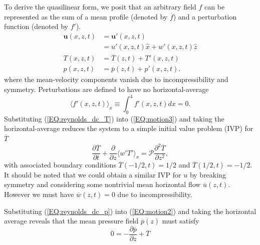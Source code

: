 \documentclass[reprint,amsmath,amssymb,aps,nofootinbib]{revtex4-1}
\renewcommand{\vec}[1]{\boldsymbol{#1}}
\newcommand{\eq}[1]{(\ref{#1})}
\begin{document}
To derive the quasilinear form, we posit that an arbitrary field $f$ can be represented as the sum of a mean profile (denoted by $\overline{f}$) and a perturbation function (denoted by $f'$).
\begin{align}
    \vec{u}(x, z, t) &= \vec{u'}(x, z, t) \label{EQ:reynolds_dc_u}\\
    &= u'(x, z, t)\hat{x} + w'(x, z, t)\hat{z} \\
    T(x, z, t) &= \overline{T}(z, t) + T'(x, z, t) \label{EQ:reynolds_dc_T}\\
    p(x, z, t) &= \overline{p}(z, t) +  p'(x, z, t) \label{EQ:reynolds_dc_p}.
\end{align}
where the mean-velocity components vanish due to incompressibility and symmetry. Perturbations are defined to have no horizontal-average
\begin{equation}
    \langle f'(x, z, t) \rangle_x \equiv \int_{0}^4 f'(x, z, t) dx = 0.
\end{equation}
Substituting \eq{EQ:reynolds_dc_T} into \eq{EQ:motion3} and taking the horizontal-average reduces the system to a simple initial value problem (IVP) for $\overline{T}$
\begin{equation}
  \frac{\partial \overline{T}}{\partial t} + \frac{\partial}{\partial z} \langle w'T' \rangle_x = \mathcal{P} \frac{\partial^2 \overline{T}}{\partial z^2}, \label{EQ:T0_IVP}
\end{equation}
with associated boundary conditions $\overline{T}(-1/2, t) = 1/2$ and $\overline{T}(1/2, t) = -1/2$. It should be noted that we could obtain a similar IVP for $u$ by breaking symmetry and considering some nontrivial mean horizontal flow $\overline{u}(z, t)$. However we must have $\overline{w}(z, t) = 0$ due to incompressibility.

Substituting \eq{EQ:reynolds_dc_p} into \eq{EQ:motion2} and taking the horizontal average reveals that the mean pressure field $\overline{p}(z)$ must satisfy
\begin{equation}
    0 = -\frac{\partial \overline{p}}{\partial z} + \overline{T}\label{EQ:p_bar}
\end{equation}
\end{document}
